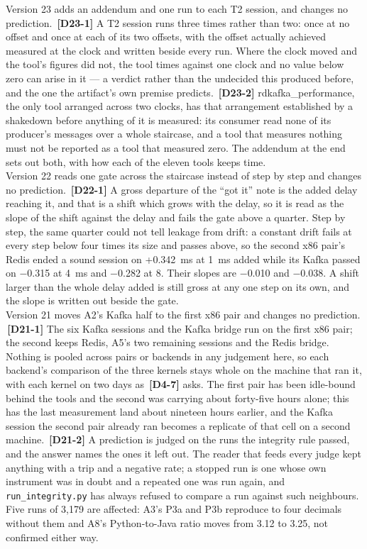 \documentclass[11pt]{article}
\newcommand{\chgold}[1]{\,{\color{oldcol}\bfseries\footnotesize[#1]}}
\begin{document}
{Version 23 adds an addendum and one run to each T2 session, and changes no prediction. \chgold{D23-1} A T2 session runs three times rather than two: once at no offset and once at each of its two offsets, with the offset actually achieved measured at the clock and written beside every run. Where the clock moved and the tool's figures did not, the tool times against one clock and no value below zero can arise in it --- a verdict rather than the undecided this produced before, and the one the artifact's own premise predicts. \chgold{D23-2} rdkafka\_performance, the only tool arranged across two clocks, has that arrangement established by a shakedown before anything of it is measured: its consumer read none of its producer's messages over a whole staircase, and a tool that measures nothing must not be reported as a tool that measured zero. The addendum at the end sets out both, with how each of the eleven tools keeps time.\\[3pt]
Version 22 reads one gate across the staircase instead of step by step and changes no prediction. \chgold{D22-1} A gross departure of the ``got it'' note is the added delay reaching it, and that is a shift which grows with the delay, so it is read as the slope of the shift against the delay and fails the gate above a quarter. Step by step, the same quarter could not tell leakage from drift: a constant drift fails at every step below four times its size and passes above, so the second x86 pair's Redis ended a sound session on +0.342~ms at 1~ms added while its Kafka passed on $-$0.315 at 4~ms and $-$0.282 at 8. Their slopes are $-$0.010 and $-$0.038. A shift larger than the whole delay added is still gross at any one step on its own, and the slope is written out beside the gate.\\[3pt]
Version 21 moves A2's Kafka half to the first x86 pair and changes no prediction. \chgold{D21-1} The six Kafka sessions and the Kafka bridge run on the first x86 pair; the second keeps Redis, A5's two remaining sessions and the Redis bridge. Nothing is pooled across pairs or backends in any judgement here, so each backend's comparison of the three kernels stays whole on the machine that ran it, with each kernel on two days as \chgold{D4-7} asks. The first pair has been idle-bound behind the tools and the second was carrying about forty-five hours alone; this has the last measurement land about nineteen hours earlier, and the Kafka session the second pair already ran becomes a replicate of that cell on a second machine. \chgold{D21-2} A prediction is judged on the runs the integrity rule passed, and the answer names the ones it left out. The reader that feeds every judge kept anything with a trip and a negative rate; a stopped run is one whose own instrument was in doubt and a repeated one was run again, and \texttt{run\_integrity.py} has always refused to compare a run against such neighbours. Five runs of 3,179 are affected: A3's P3a and P3b reproduce to four decimals without them and A8's Python-to-Java ratio moves from 3.12 to 3.25, not confirmed either way.\\[3pt]
}
\end{document}
